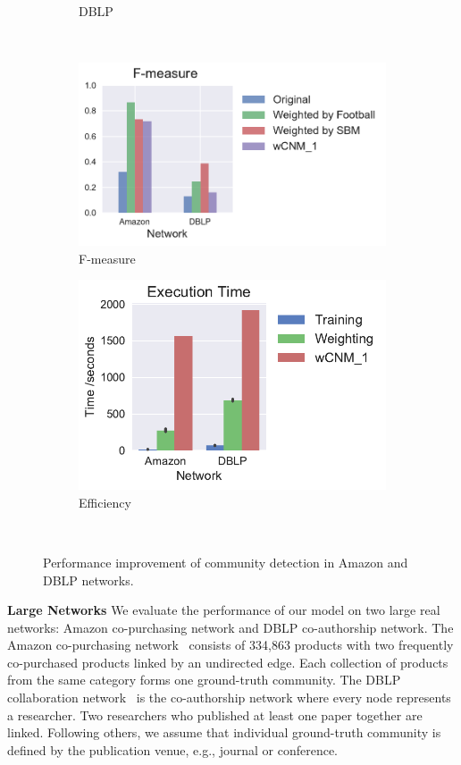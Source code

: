 \begin{figure}[ht!]
\begin{subfigure}{.45\textwidth}
\caption{DBLP}
\label{fig:2}
\end{subfigure} \\
\begin{subfigure}{.45\textwidth}
\centering
\includegraphics[width=.99\linewidth]{img/chap2/fmeasure.pdf}
\caption{F-measure}
\end{subfigure} %
\hfill %
\begin{subfigure}{.45\textwidth}
\centering
\includegraphics[width=.99\linewidth]{img/chap2/execution_time.pdf}
\caption{Efficiency}
\end{subfigure} \\
\caption{Performance improvement of community detection in Amazon and DBLP networks.}
\label{fig:comm_distribution}
\end{figure}
\textbf{Large Networks} We evaluate the performance of our model on two large real networks: Amazon co-purchasing network and DBLP co-authorship network. The Amazon co-purchasing network~\cite{yang2015defining} consists of 334,863 products with two frequently co-purchased products linked by an undirected edge. Each collection of products from the same category forms one ground-truth community. The DBLP collaboration network~\cite{yang2015defining} is the co-authorship network where every node represents a researcher. Two researchers who published at least one paper together are linked. Following others, we assume that individual ground-truth community is defined by the publication venue, e.g., journal or conference. 

